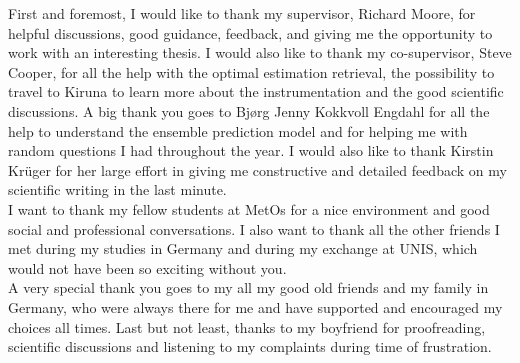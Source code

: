 
\begin{acknowledgement}   
	\noindent
	First and foremost, I would like to thank my supervisor, Richard Moore, for helpful discussions, good guidance, feedback, and giving me the opportunity to work with an interesting thesis. I would also like to thank my co-supervisor, Steve Cooper, for all the help with the optimal estimation retrieval, the possibility to travel to Kiruna to learn more about the instrumentation and the good scientific discussions. A big thank you goes to Bj\o rg Jenny Kokkvoll Engdahl for all the help to understand the ensemble prediction model and for helping me with random questions I had throughout the year. I would also like to thank Kirstin Kr\"uger for her large effort in giving me constructive and detailed feedback on my scientific writing in the last minute. 
	\\
	I want to thank my fellow students at MetOs for a nice environment and good social and professional conversations. I also want to thank all the other friends I met during my studies in Germany and during my exchange at UNIS, which would not have been so exciting without you.
	\\
	A very special thank you goes to my all my good old friends and my family in Germany, who were always there for me and have supported and encouraged my choices all times. Last but not least, thanks to my boyfriend for proofreading, scientific discussions and listening to my complaints during time of frustration.
\end{acknowledgement}
